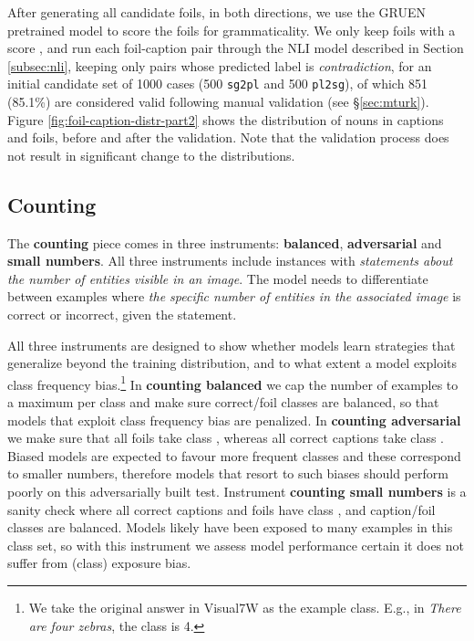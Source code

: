 \documentclass[11pt]{article}
\begin{document}
After generating all candidate foils, in both directions, we use the GRUEN pretrained model \cite{zhu-bhat-2020-gruen} to score the foils for grammaticality. We only keep foils with a score , and run each foil-caption pair through the NLI model described in Section \ref{subsec:nli}, keeping only pairs whose predicted label is {\em contradiction}, for an initial candidate set of 1000 cases (500 {\tt sg2pl} and 500 {\tt pl2sg}), of which 851 (85.1\%) are considered valid following manual validation (see \S \ref{sec:mturk}).
Figure \ref{fig:foil-caption-distr-part2} shows the distribution of nouns in captions and foils, before and after the validation. Note that the validation process does not result in significant change to the distributions.

\subsection{Counting}\label{app:counting}

The {\bf counting} piece comes in three instruments: {\bf balanced}, {\bf adversarial} and {\bf small numbers}.
All three instruments include instances with \textit{statements about the number of entities visible in an image}.
The model needs to differentiate between examples where \textit{the specific number of entities in the associated image} is correct or incorrect, given the statement.








All three instruments are designed to show whether models learn strategies that generalize beyond the training distribution, and to what extent a model exploits class frequency bias.\footnote{We take the original answer in Visual7W as the example class. E.g., in \textit{There are four zebras}, the class is 4.}
In {\bf counting balanced} we cap the number of examples to a maximum per class and make sure correct/foil classes are balanced, so that models that exploit class frequency bias are penalized.
In {\bf counting adversarial} we make sure that all foils take class , whereas all correct captions take class . Biased models are expected to favour more frequent classes and these correspond to smaller numbers, therefore models that resort to such biases should perform poorly on this adversarially built test.
Instrument {\bf counting small numbers} is a sanity check where all correct captions and foils have class , and caption/foil classes are balanced. Models likely have been exposed to many examples in this class set, so with this instrument we assess model performance certain it does not suffer from (class) exposure bias.
\end{document}
